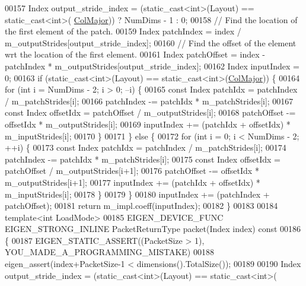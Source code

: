\begin{DoxyCode}
00157     Index output\_stride\_index = (\textcolor{keyword}{static\_cast<}\textcolor{keywordtype}{int}\textcolor{keyword}{>}(Layout) == static\_cast<int>(
      \hyperlink{group__enums_ggaacded1a18ae58b0f554751f6cdf9eb13a0cbd4bdd0abcfc0224c5fcb5e4f6669a}{ColMajor})) ? NumDims - 1 : 0;
00158     \textcolor{comment}{// Find the location of the first element of the patch.}
00159     Index patchIndex = index / m\_outputStrides[output\_stride\_index];
00160     \textcolor{comment}{// Find the offset of the element wrt the location of the first element.}
00161     Index patchOffset = index - patchIndex * m\_outputStrides[output\_stride\_index];
00162     Index inputIndex = 0;
00163     \textcolor{keywordflow}{if} (static\_cast<int>(Layout) == \textcolor{keyword}{static\_cast<}\textcolor{keywordtype}{int}\textcolor{keyword}{>}(\hyperlink{group__enums_ggaacded1a18ae58b0f554751f6cdf9eb13a0cbd4bdd0abcfc0224c5fcb5e4f6669a}{ColMajor})) \{
00164       \textcolor{keywordflow}{for} (\textcolor{keywordtype}{int} i = NumDims - 2; i > 0; --i) \{
00165         \textcolor{keyword}{const} Index patchIdx = patchIndex / m\_patchStrides[i];
00166         patchIndex -= patchIdx * m\_patchStrides[i];
00167         \textcolor{keyword}{const} Index offsetIdx = patchOffset / m\_outputStrides[i];
00168         patchOffset -= offsetIdx * m\_outputStrides[i];
00169         inputIndex += (patchIdx + offsetIdx) * m\_inputStrides[i];
00170       \}
00171     \} \textcolor{keywordflow}{else} \{
00172       \textcolor{keywordflow}{for} (\textcolor{keywordtype}{int} i = 0; i < NumDims - 2; ++i) \{
00173         \textcolor{keyword}{const} Index patchIdx = patchIndex / m\_patchStrides[i];
00174         patchIndex -= patchIdx * m\_patchStrides[i];
00175         \textcolor{keyword}{const} Index offsetIdx = patchOffset / m\_outputStrides[i+1];
00176         patchOffset -= offsetIdx * m\_outputStrides[i+1];
00177         inputIndex += (patchIdx + offsetIdx) * m\_inputStrides[i];
00178       \}
00179     \}
00180     inputIndex += (patchIndex + patchOffset);
00181     \textcolor{keywordflow}{return} m\_impl.coeff(inputIndex);
00182   \}
00183 
00184   \textcolor{keyword}{template}<\textcolor{keywordtype}{int} LoadMode>
00185   EIGEN\_DEVICE\_FUNC EIGEN\_STRONG\_INLINE PacketReturnType packet(Index index)\textcolor{keyword}{ const}
00186 \textcolor{keyword}{  }\{
00187     EIGEN\_STATIC\_ASSERT((PacketSize > 1), YOU\_MADE\_A\_PROGRAMMING\_MISTAKE)
00188     eigen\_assert(index+PacketSize-1 < dimensions().TotalSize());
00189 
00190     Index output\_stride\_index = (\textcolor{keyword}{static\_cast<}\textcolor{keywordtype}{int}\textcolor{keyword}{>}(Layout) == static\_cast<int>(

\end{DoxyCode}
